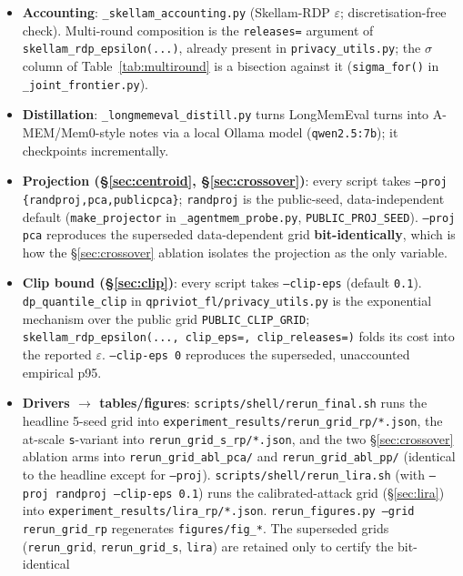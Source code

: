 \documentclass[pdflatex,sn-mathphys-num,iicol]{sn-jnl}
\theoremstyle{thmstyleone}%
\theoremstyle{thmstyletwo}%
\theoremstyle{thmstylethree}%
\newcommand{\eps}{\varepsilon}
\newcommand{\secref}[1]{\S\ref{#1}}
\begin{document}
\begin{appendices}
\begin{itemize}
  \item \textbf{Accounting}: \texttt{\_skellam\_accounting.py} (Skellam-RDP $\eps$;
    discretisation-free check). Multi-round composition is the \texttt{releases=} argument of
    \texttt{skellam\_rdp\_epsilon(...)}, already present in \texttt{privacy\_utils.py}; the
    $\sigma$ column of Table~\ref{tab:multiround} is a bisection against it
    (\texttt{sigma\_for()} in \texttt{\_joint\_frontier.py}).
  \item \textbf{Distillation}: \texttt{\_longmemeval\_distill.py} turns LongMemEval turns into
    A-MEM/Mem0-style notes via a local Ollama model (\texttt{qwen2.5:7b}); it checkpoints
    incrementally.
  \item \textbf{Projection (\secref{sec:centroid}, \secref{sec:crossover})}: every script takes
    \texttt{--proj \{randproj,pca,publicpca\}}; \texttt{randproj} is the public-seed,
    data-independent default (\texttt{make\_projector} in \texttt{\_agentmem\_probe.py},
    \texttt{PUBLIC\_PROJ\_SEED}). \texttt{--proj pca} reproduces the superseded data-dependent grid
    \textbf{bit-identically}, which is how the \secref{sec:crossover} ablation isolates the projection
    as the only variable.
  \item \textbf{Clip bound (\secref{sec:clip})}: every script takes \texttt{--clip-eps} (default
    \texttt{0.1}). \texttt{dp\_quantile\_clip} in \texttt{qpriviot\_fl/privacy\_utils.py} is the
    exponential mechanism over the public grid \texttt{PUBLIC\_CLIP\_GRID};
    \texttt{skellam\_rdp\_epsilon(..., clip\_eps=, clip\_releases=)} folds its cost into the reported
    $\eps$. \texttt{--clip-eps 0} reproduces the superseded, unaccounted empirical p95.
  \item \textbf{Drivers $\to$ tables/figures}: \texttt{scripts/shell/rerun\_final.sh} runs the headline
    5-seed grid into \texttt{experiment\_results/rerun\_grid\_rp/*.json}, the at-scale
    \texttt{s}-variant into \texttt{rerun\_grid\_s\_rp/*.json}, and the two \secref{sec:crossover}
    ablation arms into \texttt{rerun\_grid\_abl\_pca/} and \texttt{rerun\_grid\_abl\_pp/} (identical to
    the headline except for \texttt{--proj}). \texttt{scripts/shell/rerun\_lira.sh} (with
    \texttt{--proj randproj --clip-eps 0.1}) runs the calibrated-attack grid (\secref{sec:lira}) into
    \texttt{experiment\_results/lira\_rp/*.json}. \texttt{rerun\_figures.py --grid rerun\_grid\_rp}
    regenerates \texttt{figures/fig\_*}. The superseded grids (\texttt{rerun\_grid},
    \texttt{rerun\_grid\_s}, \texttt{lira}) are retained only to certify the bit-identical

\end{itemize}
\end{appendices}
\end{document}
